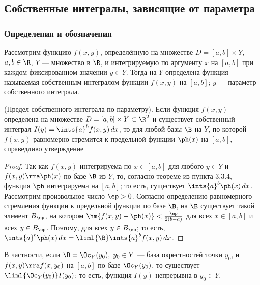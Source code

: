 \documentclass[a4paper]{article}
\begin{document}
\subsection{Собственные интегралы, зависящие от параметра}
\subsubsection{Определения и обозначения}

Рассмотрим функцию $f(x,y)$, определённую на множестве
$D=[a,b]\times Y$, $a,b\in\R$, $Y$ --- множество в $\R$, и
интегрируемую по аргументу $x$ на $[a,b]$ при каждом фиксированном
значении $y\in Y$. Тогда на $Y$ определена функция
 называемая собственным
интегралом функции $f(x,y)$ на $[a,b]$; $y$ --- параметр
собственного интеграла.

\begin{theorem}\label{thm3.16}
(Предел собственного интеграла по параметру). Если функция $f(x,y)$
определена на множестве $D = [a,b]\times Y\subset\R^2$ и существует
собственный интеграл $I(y)=\ints{a}^b f(x,y)\,dx$, то для любой базы
$\B$ на $Y$, по которой $f(x,y)$ равномерно стремится к предельной
функции $\ph(x)$ на $[a,b]$, справедливо утверждение
\end{theorem}

\begin{proof}
Так как $f(x,y)$ интегрируема по $x\in [a,b]$ для любого $y\in Y$ и
$f(x,y)\rra \ph(x)$ по базе $\B$ из $Y$, то, согласно теореме из
пункта 3.3.4, функция $\ph$ интегрируема на $[a,b]$; то есть,
существует $\ints{a}^b \ph(x)\,dx$. Рассмотрим произвольное число
$\ep>0$. Согласно определению равномерного стремления функции к
предельной функции по базе $\B$, на $\B$ существует такой элемент
$B_{\ep}$, на котором $\hm{f(x,y) - \ph(x)} < \frac{\ep}{2(b-a)}$
для всех $x\in[a,b]$ и всех $y\in B_{\ep}$. Поэтому,
 для всех $y\in B_{\ep}$; то есть, $\ints{a}^b
\ph(x)\,dx = \liml{\B} \ints{a}^b f(x,y)\,dx$.
\end{proof}

В частности, если $\B=\Oc_Y(y_0), \; y_0\in Y$ --- база окрестностей
точки $y_0$, и $f(x,y)\rra f(x,y_0)$ на $[a,b]$ по базе
$\Oc_Y(y_0)$, то существует $\liml{\Oc_Y(y_0)} I(y_0)$; то есть,
функция $I(y)$ непрерывна в $y_0\in Y$.
\end{document}
